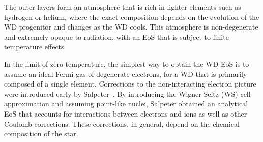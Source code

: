 The outer layers form an atmosphere that is rich in lighter elements such as hydrogen or helium, where the exact composition depends on the evolution of the WD progenitor and changes as the WD cools. 
This atmosphere is non-degenerate and extremely opaque to radiation, with an EoS that is subject to finite temperature effects. 

In the limit of zero temperature, the simplest way to obtain the WD EoS is to assume an ideal Fermi gas of degenerate electrons, for a WD that is primarily composed of a single element. Corrections to the non-interacting electron picture were introduced early by Salpeter~\cite{Salpeter:1961zz_nov_Energypressurezerotemperature}. By introducing the Wigner-Seitz (WS) cell approximation and assuming point-like nuclei, Salpeter obtained an analytical EoS that accounts for interactions between electrons and ions as well as other Coulomb corrections. These corrections, in general, depend on the chemical composition of the star. 

